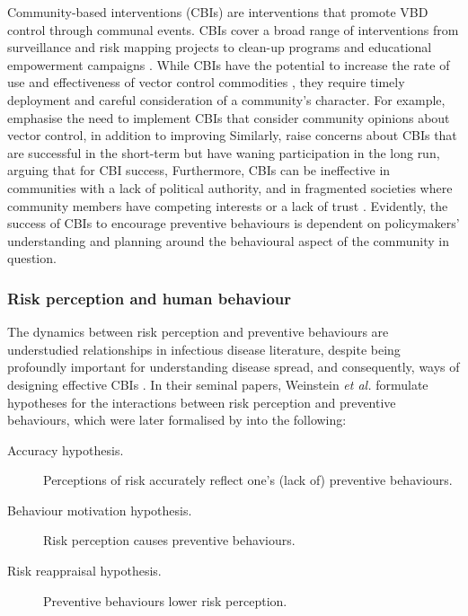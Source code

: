 Community-based interventions (CBIs) are interventions that promote VBD control through communal events. CBIs cover a broad range of interventions from surveillance and risk mapping projects to clean-up programs and educational empowerment campaigns \cite{perez_realist_2021}. While CBIs have the potential to increase the rate of use and effectiveness of vector control commodities \cite{winch_effectiveness_1992}, they require timely deployment and careful consideration of a community's character.  For example, \citet{sulistyawati_dengue_2019} emphasise the need to implement  CBIs that consider community opinions about vector control, in addition to improving  Similarly, \citet{tapia-conyer_community_2012} raise concerns about CBIs that are successful in the short-term but have waning participation in the long run, arguing that for CBI success,  Furthermore, CBIs can be ineffective in communities with a lack of political authority, and in fragmented societies where community members have competing interests or a lack of trust \cite{khun_community_2008}. Evidently, the success of CBIs to encourage preventive behaviours is dependent on policymakers' understanding and planning around the behavioural aspect of the community in question.

\subsubsection{Risk perception and human behaviour}\label{sec:risk-perception}

The dynamics between risk perception and preventive behaviours are understudied relationships in infectious disease literature, despite being profoundly important for understanding disease spread, and consequently, ways of designing effective CBIs \cite{williams_role_2010}. In their seminal papers, Weinstein \textit{et al.} \cite{weinstein_correct_1993, weinstein_use_1998} formulate hypotheses for the interactions between risk perception and preventive behaviours, which were later formalised by \citet{brewer_risk_2004} into the following:

\begin{description}
\item[Accuracy hypothesis.] Perceptions of risk accurately reflect one's (lack of) preventive behaviours.
\item[Behaviour motivation hypothesis.] Risk perception causes preventive behaviours.
\item[Risk reappraisal hypothesis.] Preventive behaviours lower risk perception.
\end{description}

